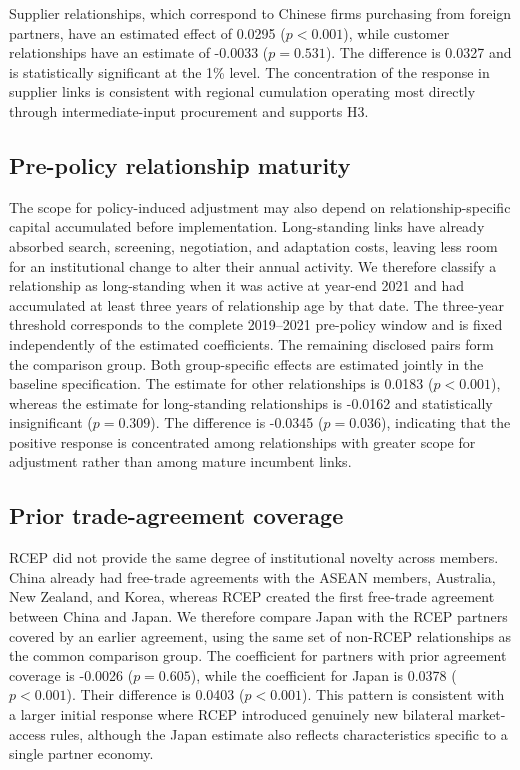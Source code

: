 \documentclass[preprint,12pt,authoryear]{elsarticle}
\begin{document}
Supplier relationships, which correspond to Chinese firms purchasing from foreign partners, have an estimated effect of 0.0295 ($p<0.001$), while customer relationships have an estimate of -0.0033 ($p=0.531$). The difference is 0.0327 and is statistically significant at the 1\% level. The concentration of the response in supplier links is consistent with regional cumulation operating most directly through intermediate-input procurement and supports H3.

\subsection{Pre-policy relationship maturity}

The scope for policy-induced adjustment may also depend on relationship-specific capital accumulated before implementation. Long-standing links have already absorbed search, screening, negotiation, and adaptation costs, leaving less room for an institutional change to alter their annual activity. We therefore classify a relationship as long-standing when it was active at year-end 2021 and had accumulated at least three years of relationship age by that date. The three-year threshold corresponds to the complete 2019--2021 pre-policy window and is fixed independently of the estimated coefficients. The remaining disclosed pairs form the comparison group. Both group-specific effects are estimated jointly in the baseline specification. The estimate for other relationships is 0.0183 ($p<0.001$), whereas the estimate for long-standing relationships is -0.0162 and statistically insignificant ($p=0.309$). The difference is -0.0345 ($p=0.036$), indicating that the positive response is concentrated among relationships with greater scope for adjustment rather than among mature incumbent links.

\subsection{Prior trade-agreement coverage}

RCEP did not provide the same degree of institutional novelty across members. China already had free-trade agreements with the ASEAN members, Australia, New Zealand, and Korea, whereas RCEP created the first free-trade agreement between China and Japan. We therefore compare Japan with the RCEP partners covered by an earlier agreement, using the same set of non-RCEP relationships as the common comparison group. The coefficient for partners with prior agreement coverage is -0.0026 ($p=0.605$), while the coefficient for Japan is 0.0378 ($p<0.001$). Their difference is 0.0403 ($p<0.001$). This pattern is consistent with a larger initial response where RCEP introduced genuinely new bilateral market-access rules, although the Japan estimate also reflects characteristics specific to a single partner economy.
\end{document}
